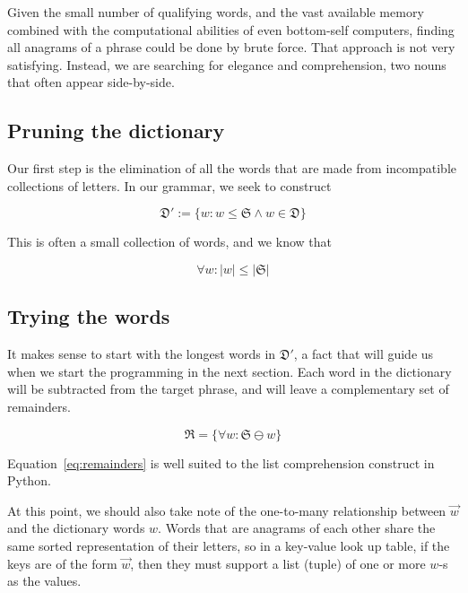 \documentclass[letterpaper, 11pt]{article}
\newcommand{\Dp}{$\mathfrak{D}'$\xspace}
\newcommand{\w}{$w$\xspace}
\newcommand{\aw}{$\overrightarrow{w}$\xspace}
\begin{document}
Given the small number of qualifying words, and the vast available
memory combined with the computational abilities of even bottom-self
computers, finding all anagrams of a phrase could be done by brute
force. That approach is not very satisfying. Instead, we are searching
for elegance and comprehension, two nouns that often appear
side-by-side.

\subsection{Pruning the dictionary}

Our first step is the elimination of all the words that are made
from incompatible collections of letters. In our grammar, we seek
to construct

\begin{equation}
\label{eq:deriveddictionaries}
\mathfrak{D}' := \{w:w \leq \mathfrak{S} \wedge w \in \mathfrak{D}\}
\end{equation}

This is often a small collection of words, and we know that 

\begin{equation}
\label{eq:wordlength}
\forall w: |w| \leq |\mathfrak{S}|
\end{equation}


\subsection{Trying the words}

It makes sense to start with the longest words in \Dp, a fact that
will guide us when we start the programming in the next section.
Each word in the dictionary will be subtracted from the target
phrase, and will leave a complementary set of remainders.

\begin{equation}
\label{eq:remainders}
\mathfrak{R} = \{\forall w : \mathfrak{S} \ominus w \}
\end{equation}

Equation~\ref{eq:remainders} is well suited to the list comprehension
construct in Python.

At this point, we should also take note of the one-to-many relationship
between \aw and the dictionary words \w. Words that are anagrams
of each other share the same sorted representation of their letters,
so in a key-value look up table, if the keys are of the form \aw,
then they must support a list (tuple) of one or more \w-s as the
values.
\end{document}
